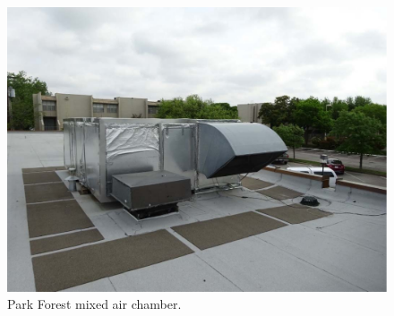 \begin{figure}
\centering
\includegraphics[width=\textwidth]{Images/ParkForestMixedAirChamber.PNG}
\caption{Park Forest mixed air chamber.}
\label{fig:ParkForestMixedAirChamber}
\end{figure}

